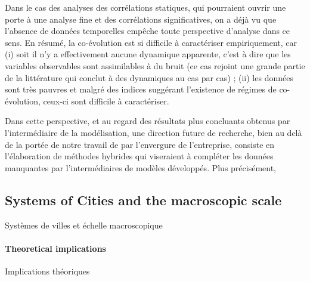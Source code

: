 Dans le cas des analyses des corrélations statiques, qui pourraient ouvrir une porte à une analyse fine et des corrélations significatives, on a déjà vu que l'absence de données temporelles empêche toute perspective d'analyse dans ce sens. En résumé, la co-évolution est si difficile à caractériser empiriquement, car (i) soit il n'y a effectivement aucune dynamique apparente, c'est à dire que les variables observables sont assimilables à du bruit (ce cas rejoint une grande partie de la littérature qui conclut à des dynamiques au cas par cas) ; (ii) les données sont très pauvres et malgré des indices suggérant l'existence de régimes de co-évolution, ceux-ci sont difficile à caractériser.


Dans cette perspective, et au regard des résultats plus concluants obtenus par l'intermédiaire de la modélisation, une direction future de recherche, bien au delà de la portée de notre travail de par l'envergure de l'entreprise, consiste en l'élaboration de méthodes hybrides qui viseraient à compléter les données manquantes par l'intermédiaires de modèles développés. Plus précisément, %



\subsection{Systems of Cities and the macroscopic scale}{Systèmes de villes et échelle macroscopique}






\paragraph{Theoretical implications}{Implications théoriques}


